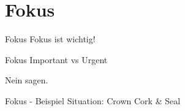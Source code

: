 \section{Fokus}

\begin{frame}[c]{Fokus}
    \Huge
    Fokus ist wichtig!
\end{frame}


\begin{frame}[c]{Fokus}
    \Huge
    Important vs Urgent
\end{frame}


\begin{frame}[standout]
    \Huge
    Nein sagen.
\end{frame}


\begin{frame}[c]{Fokus - Beispiel}
    \Large
    Situation: Crown Cork \& Seal
\end{frame}




